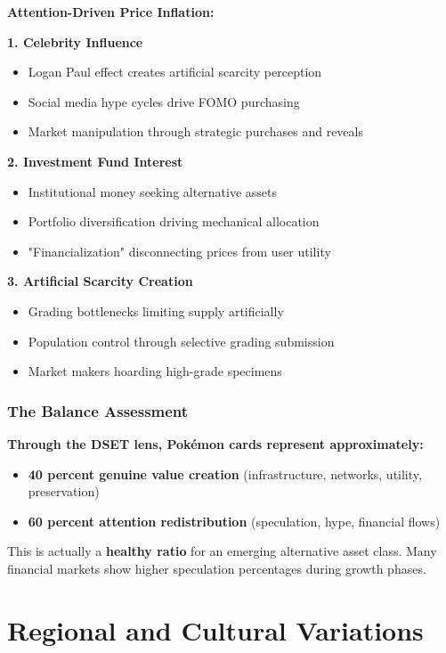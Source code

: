 \documentclass[11pt,oneside]{book}
\begin{document}
{{{{{{\textbf{Attention-Driven Price Inflation:}

\textbf{1. Celebrity Influence}
\begin{itemize}
\item Logan Paul effect creates artificial scarcity perception
\item Social media hype cycles drive FOMO purchasing
\item Market manipulation through strategic purchases and reveals
\end{itemize}

\textbf{2. Investment Fund Interest}
\begin{itemize}
\item Institutional money seeking alternative assets
\item Portfolio diversification driving mechanical allocation
\item "Financialization" disconnecting prices from user utility
\end{itemize}

\textbf{3. Artificial Scarcity Creation}
\begin{itemize}
\item Grading bottlenecks limiting supply artificially
\item Population control through selective grading submission
\item Market makers hoarding high-grade specimens
\end{itemize}

\subsubsection{The Balance Assessment}

\textbf{Through the DSET lens, Pokémon cards represent approximately:}
\begin{itemize}
\item \textbf{40 percent genuine value creation} (infrastructure, networks, utility, preservation)
\item \textbf{60 percent attention redistribution} (speculation, hype, financial flows)
\end{itemize}

This is actually a \textbf{healthy ratio} for an emerging alternative asset class. Many financial markets show higher speculation percentages during growth phases.

\section{Regional and Cultural Variations}

}}}}}}
\end{document}
